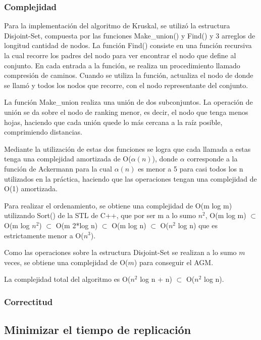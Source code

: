 \documentclass[a4paper, 10pt, twoside]{article}
\begin{document}
\subsubsection{Complejidad}

Para la implementación del algoritmo de Kruskal, se utilizó la estructura Disjoint-Set, compuesta por las funciones Make\_union() y Find() y 3 arreglos de longitud cantidad de nodos.
La función Find() consiste en una función recursiva la cual recorre los padres del nodo para ver encontrar el nodo que define al conjunto. En cada entrada a la función, se realiza un procedimiento llamado compresión de caminos. Cuando se utiliza la función, actualiza el nodo de donde se llamó y todos los nodos que recorre, con el nodo representante del conjunto.

La función Make\_union realiza una unión de dos subconjuntos. La operación de unión se da sobre el nodo de ranking menor, es decir, el nodo que tenga menos hojas, haciendo que cada unión quede lo más cercana a la raíz posible, comprimiendo distancias.

Mediante la utilización de estas dos funciones se logra que cada llamada a estas tenga una complejidad amortizada de O($\alpha(n)$), donde $\alpha$ corresponde a la función de Ackermann para la cual $\alpha(n)$ es menor a 5 para casi todos los n utilizados en la práctica, haciendo que las operaciones tengan una complejidad de O(1) amortizada.

Para realizar el ordenamiento, se obtiene una complejidad de O(m log m) utilizando Sort() de la STL de C++, que por ser m a lo sumo $n^2$, O(m log m) $\subset$ O(m log $n^2$) $\subset$ O(m 2*log n) $\subset$ O(m log n) $\subset$ O($n^2$ log n) que es estrictamente menor a O($n^3$).

Como las operaciones sobre la estructura Disjoint-Set se realizan a lo sumo $m$ veces, se obtiene una complejidad de O($m$) para conseguir el AGM.

La complejidad total del algoritmo es O($n^2$ log n + n) $\subset$ O($n^2$ log n).

\subsubsection{Correctitud}


\subsection{Minimizar el tiempo de replicación}
\end{document}
